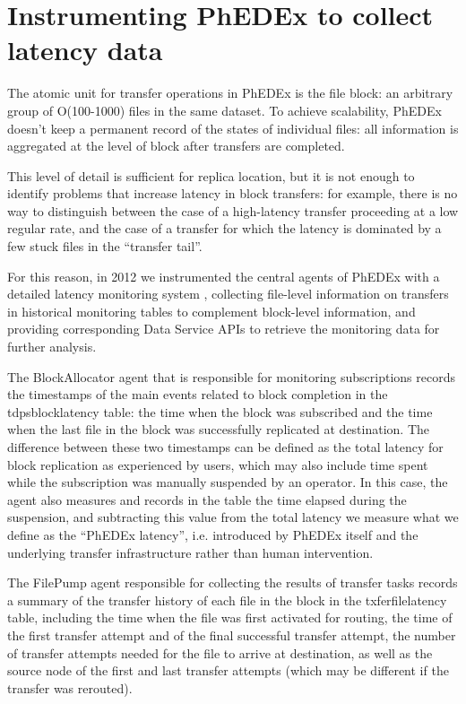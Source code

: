 \section{Instrumenting PhEDEx to collect latency data}
The atomic unit for transfer operations in PhEDEx is the file block: an arbitrary group of O(100-1000) files in the same dataset.
To achieve scalability, PhEDEx doesn't keep a permanent record of the states of individual files: all information is aggregated at the level of block after transfers are completed.

This level of detail is sufficient for replica location, but it is not enough to identify problems that increase latency in block transfers: for example, there is no way to distinguish between the case of a high-latency transfer proceeding at a low regular rate, and the case of a transfer for which the latency is dominated by a few stuck files in the ``transfer tail''.

For this reason, in 2012 we instrumented the central agents of PhEDEx with a detailed latency monitoring system \cite{phedexlatency}, collecting file-level information on transfers in historical monitoring tables to complement block-level information, and providing corresponding Data Service APIs to retrieve the monitoring data for further analysis.

The BlockAllocator agent that is responsible for monitoring subscriptions records the timestamps of the main events related to block completion in the t\textunderscore dps\textunderscore block\textunderscore latency table: the time when the block was subscribed and the time when the last file in the block was successfully replicated at destination.
The difference between these two timestamps can be defined as the total latency for block replication as experienced by users, which may also include time spent while the subscription was manually suspended by an operator.
In this case, the agent also measures and records in the table the time elapsed during the suspension, and subtracting this value from the total latency we measure what we define as the ``PhEDEx latency'', i.e. introduced by PhEDEx itself and the underlying transfer infrastructure rather than human intervention.


The FilePump agent responsible for collecting the results of transfer tasks records a summary of the transfer history of each file in the block in the t\textunderscore xfer\textunderscore file\textunderscore latency table, including the time when the file was first activated for routing, the time of the first transfer attempt and of the final successful transfer attempt, the number of transfer attempts needed for the file to arrive at destination, as well as the source node of the first and last transfer attempts (which may be different if the transfer was rerouted).



